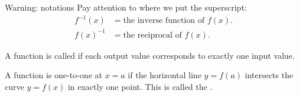 \documentclass[10pt,t,presentation,ignorenonframetext,aspectratio=169]{beamer}
\begin{document}
\begin{frame}
  \vs
  \begin{block}{Warning: notations}
    Pay attention to where we put the superscript:
    \begin{align*}
      f^{-1}(x) &= \text{the inverse function of $f(x)$.}\\
      f(x)^{-1} &= \text{the reciprocal of $f(x)$.}
    \end{align*}
  \end{block}
\end{frame}

\begin{frame}
  \vs
  \begin{definition}
    A function is called  if each output value corresponds
    to exactly one input value.
  \end{definition}
\end{frame}

\begin{frame}
  \vs
  \begin{theorem}
    A function is one-to-one at $x=a$ if the horizontal line $y = f(a)$
    intersects the curve $y=f(x)$ in exactly one point. This is called
    the .
  \end{theorem}
\end{frame}
\end{document}
